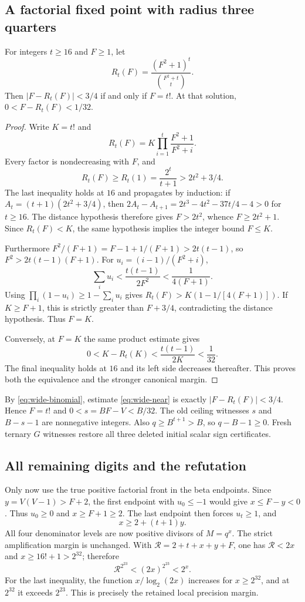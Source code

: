 \subsection{A factorial fixed point with radius three quarters}
\begin{lemma}\label{lem:wide-factorial}
For integers $t\ge16$ and $F\ge1$, let
\[
 R_t(F)=\frac{(F^2+1)^t}{\binom{F^2+t}{t}}.
\]
Then $|F-R_t(F)|<3/4$ if and only if $F=t!$. At that solution,
$0<F-R_t(F)<1/32$.
\end{lemma}
\begin{proof}
Write $K=t!$ and
\[
 R_t(F)=K\prod_{i=1}^t\frac{F^2+1}{F^2+i}.
\]
Every factor is nondecreasing with $F$, and
\[
 R_t(F)\ge R_t(1)=\frac{2^t}{t+1}>2t^2+3/4.
\]
The last inequality holds at $16$ and propagates by induction: if
$A_t=(t+1)(2t^2+3/4)$, then
$2A_t-A_{t+1}=2t^3-4t^2-37t/4-4>0$ for $t\ge16$.
The distance hypothesis therefore gives $F>2t^2$, whence
$F\ge2t^2+1$. Since $R_t(F)<K$, the same hypothesis implies the
integer bound $F\le K$.

Furthermore
$F^2/(F+1)=F-1+1/(F+1)>2t(t-1)$, so
$F^2>2t(t-1)(F+1)$. For $u_i=(i-1)/(F^2+i)$,
\[
 \sum_i u_i<\frac{t(t-1)}{2F^2}<\frac1{4(F+1)}.
\]
Using $\prod_i(1-u_i)\ge1-\sum_i u_i$ gives
$R_t(F)>K(1-1/[4(F+1)])$. If $K\ge F+1$, this is
strictly greater than $F+3/4$, contradicting the distance hypothesis.
Thus $F=K$.

Conversely, at $F=K$ the same product estimate gives
\[
 0<K-R_t(K)<\frac{t(t-1)}{2K}<\frac1{32}.
\]
The final inequality holds at $16$ and its left side decreases thereafter.
This proves both the equivalence and the stronger canonical margin.
\end{proof}

By \eqref{eq:wide-binomial}, estimate \eqref{eq:wide-near} is exactly
$|F-R_t(F)|<3/4$. Hence $F=t!$ and $0<s=BF-V<B/32$.
The old ceiling witnesses $s$ and $B-s-1$ are nonnegative integers.
Also $q\ge B^{t+1}>B$, so $q-B-1\ge0$. Fresh ternary $G$ witnesses
restore all three deleted initial scalar sign certificates.

\subsection{All remaining digits and the refutation}
Only now use the true positive factorial front in the beta endpoints.
Since $y=V(V-1)>F+2$, the first endpoint with $u_0\le-1$ would give
$x\le F-y<0$. Thus $u_0\ge0$ and $x\ge F+1\ge2$.
The last endpoint then forces $u_t\ge1$, and
\begin{equation}\label{eq:wide-endpoint}
 x\ge2+(t+1)y.
\end{equation}
All four denominator levels are now positive divisors of $M=q^x$.
The strict amplification margin is unchanged. With
$\mathcal R=2+t+x+y+F$, one has $\mathcal R<2x$ and
$x\ge16!+1>2^{32}$; therefore
\[
 \mathcal R^{2^{23}}<(2x)^{2^{23}}<2^x.
\]
For the last inequality, the function $x/\log_2(2x)$ increases for
$x\ge2^{32}$, and at $2^{32}$ it exceeds $2^{23}$.
This is precisely the retained local precision margin.

